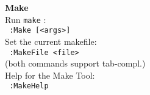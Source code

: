 \documentclass[oneside,10pt,landscape,DIV16]{scrartcl}
\begin{document}
\begin{multicols}{3}
\begin{center}
{%
\large{\textbf{Make}}\\[1.0ex]
Run \texttt{make} : \\[1.0ex]
\texttt{ :Make [<args>]} \\[1.0ex]
Set the current makefile: \\[1.0ex]
\texttt{ :MakeFile <file>} \\[1.0ex]
(both commands support tab-compl.) \\[1.0ex]
Help for the Make Tool: \\[1.0ex]
\texttt{ :MakeHelp} \\[2.5ex]
}
%
\end{center}%
\end{multicols}%
%
\end{document}
